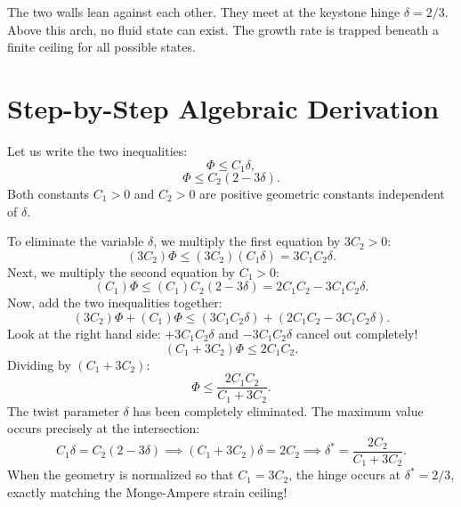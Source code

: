 \documentclass[11pt,a4paper]{article}
\theoremstyle{definition}
\begin{document}
The two walls lean against each other. They meet at the keystone hinge $\delta = 2/3$. Above this arch, no fluid state can exist. The growth rate is trapped beneath a finite ceiling for all possible states.


\section{Step-by-Step Algebraic Derivation}

Let us write the two inequalities:
\begin{equation}
\Phi \le C_1 \delta,
\end{equation}
\begin{equation}
\Phi \le C_2(2 - 3\delta).
\end{equation}
Both constants $C_1 > 0$ and $C_2 > 0$ are positive geometric constants independent of $\delta$.

To eliminate the variable $\delta$, we multiply the first equation by $3C_2 > 0$:
\begin{equation}
(3C_2) \Phi \le (3C_2) (C_1 \delta) = 3 C_1 C_2 \delta.
\end{equation}
Next, we multiply the second equation by $C_1 > 0$:
\begin{equation}
(C_1) \Phi \le (C_1) C_2 (2 - 3\delta) = 2 C_1 C_2 - 3 C_1 C_2 \delta.
\end{equation}
Now, add the two inequalities together:
\begin{equation}
(3C_2)\Phi + (C_1)\Phi \le \left( 3C_1 C_2 \delta \right) + \left( 2C_1 C_2 - 3C_1 C_2 \delta \right).
\end{equation}
Look at the right hand side: $+3C_1 C_2 \delta$ and $-3C_1 C_2 \delta$ cancel out completely!
\begin{equation}
(C_1 + 3C_2)\Phi \le 2C_1 C_2.
\end{equation}
Dividing by $(C_1 + 3C_2)$:
\begin{equation}
\Phi \le \frac{2 C_1 C_2}{C_1 + 3 C_2}.
\end{equation}
The twist parameter $\delta$ has been completely eliminated. The maximum value occurs precisely at the intersection:
\begin{equation}
C_1 \delta = C_2(2 - 3\delta) \implies (C_1 + 3C_2)\delta = 2C_2 \implies \delta^* = \frac{2C_2}{C_1 + 3C_2}.
\end{equation}
When the geometry is normalized so that $C_1 = 3C_2$, the hinge occurs at $\delta^* = 2/3$, exactly matching the Monge-Ampere strain ceiling!
\end{document}
